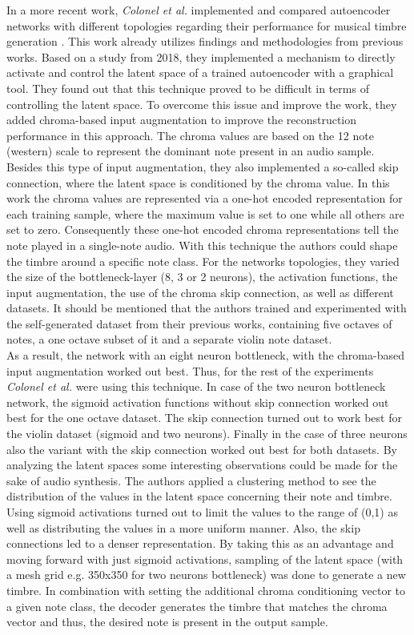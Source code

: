 In a more recent work, \textit{Colonel et al.} implemented and compared autoencoder networks with different topologies regarding their performance for musical timbre generation \cite{Colonel2020}. This work already utilizes findings and methodologies from previous works. Based on a study from 2018, they implemented a mechanism to directly activate and control the latent space of a trained autoencoder with a graphical tool. They found out that this technique proved to be difficult in terms of controlling the latent space. To overcome this issue and improve the work, they added chroma-based input augmentation to improve the reconstruction performance in this approach. The chroma values are based on the 12 note (western) scale to represent the dominant note present in an audio sample. Besides this type of input augmentation, they also implemented a so-called skip connection, where the latent space is conditioned by the chroma value. In this work the chroma values are represented via a one-hot encoded representation for each training sample, where the maximum value is set to one while all others are set to zero. Consequently these one-hot encoded chroma representations tell the note played in a single-note audio. With this technique the authors could shape the timbre around a specific note class. For the networks topologies, they varied the size of the bottleneck-layer (8, 3 or 2 neurons), the activation functions, the input augmentation, the use of the chroma skip connection, as well as different datasets. It should be mentioned that the authors trained and experimented with the self-generated dataset from their previous works, containing five octaves of notes, a one octave subset of it and a separate violin note dataset.\\
As a result, the network with an eight neuron bottleneck, with the chroma-based input augmentation worked out best. Thus, for the rest of the experiments \textit{Colonel et al.} were using this technique. In case of the two neuron bottleneck network, the sigmoid activation functions without skip connection worked out best for the one octave dataset. The skip connection turned out to work best for the violin dataset (sigmoid and two neurons). Finally in the case of three neurons also the variant with the skip connection worked out best for both datasets. By analyzing the latent spaces some interesting observations could be made for the sake of audio synthesis. The authors applied a clustering method to see the distribution of the values in the latent space concerning their note and timbre. Using sigmoid activations turned out to limit the values to the range of (0,1) as well as distributing the values in a more uniform manner. Also, the skip connections led to a denser representation. By taking this as an advantage and moving forward with just sigmoid activations, sampling of the latent space (with a mesh grid e.g. 350x350 for two neurons bottleneck) was done to generate a new timbre. In combination with setting the additional chroma conditioning vector to a given note class, the decoder generates the timbre that matches the chroma vector and thus, the desired note is present in the output sample.

